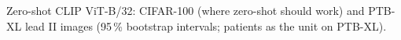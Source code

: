 \begin{table}[htbp]
\centering
\caption[Zero-shot CLIP]{Zero-shot CLIP ViT-B/32: CIFAR-100 (where zero-shot should work) and PTB-XL lead II images (95\,\% bootstrap intervals; patients as the unit on PTB-XL).}
\label{tab:zeroshot}
\small
\begin{adjustbox}{max width=\textwidth}

\end{adjustbox}
\end{table}
